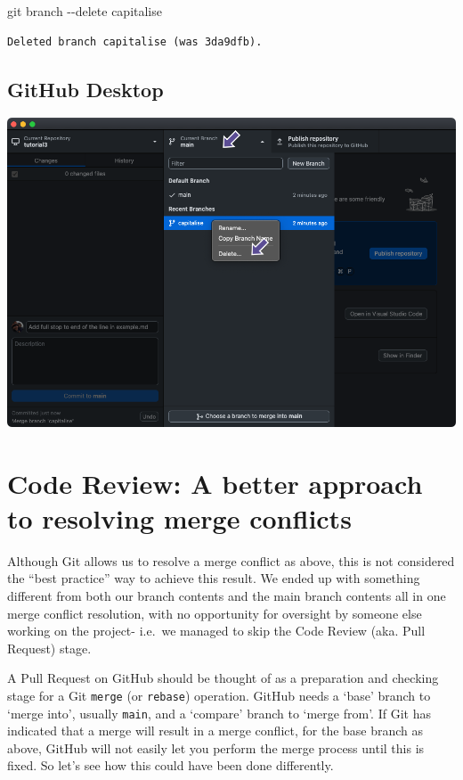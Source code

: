 \documentclass[
  letterpaper,
  DIV=11,
  numbers=noendperiod]{scrartcl}
\newenvironment{Shaded}{\begin{snugshade}}{\end{snugshade}}
\newcommand{\AttributeTok}[1]{\textcolor[rgb]{0.40,0.45,0.13}{#1}}
\newcommand{\FunctionTok}[1]{\textcolor[rgb]{0.28,0.35,0.67}{#1}}
\newcommand{\NormalTok}[1]{\textcolor[rgb]{0.00,0.23,0.31}{#1}}
\begin{document}
\begin{Shaded}
\begin{Highlighting}[]
\FunctionTok{git}\NormalTok{ branch }\AttributeTok{{-}{-}delete}\NormalTok{ capitalise}
\end{Highlighting}
\end{Shaded}

\begin{verbatim}
Deleted branch capitalise (was 3da9dfb).
\end{verbatim}

\subsection{GitHub Desktop}

\includegraphics{images/image57.png}

\hypertarget{code-review-a-better-approach-to-resolving-merge-conflicts}{%
\section{Code Review: A better approach to resolving merge
conflicts}\label{code-review-a-better-approach-to-resolving-merge-conflicts}}

Although Git allows us to resolve a merge conflict as above, this is not
considered the ``best practice'' way to achieve this result. We ended up
with something different from both our branch contents and the main
branch contents all in one merge conflict resolution, with no
opportunity for oversight by someone else working on the project-
i.e.~we managed to skip the Code Review (aka. Pull Request) stage.

A Pull Request on GitHub should be thought of as a preparation and
checking stage for a Git \texttt{merge} (or \texttt{rebase}) operation.
GitHub needs a `base' branch to `merge into', usually \texttt{main}, and
a `compare' branch to `merge from'. If Git has indicated that a merge
will result in a merge conflict, for the base branch as above, GitHub
will not easily let you perform the merge process until this is fixed.
So let's see how this could have been done differently.
\end{document}
